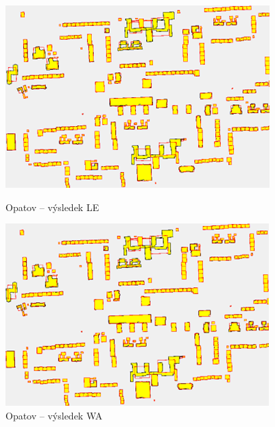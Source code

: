 \documentclass{article}
\begin{document}
\begin{spacing}{1.5}
\begin{figure}[htbp]
  \centering
  \begin{minipage}[b]{0.43\textwidth}
    \includegraphics[width=\textwidth]{images/Opatov_le.png}
    \caption{Opatov – výsledek LE}
  \end{minipage}
  \hfill
  \begin{minipage}[b]{0.43\textwidth}
    \includegraphics[width=\textwidth]{images/Opatov_wa.png}
    \caption{Opatov – výsledek WA}
  \end{minipage}
\end{figure}


\end{spacing}
\end{document}
